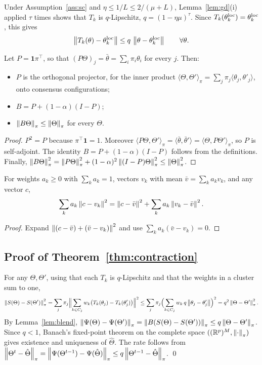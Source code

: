 Under Assumption~\ref{ass:sc} and $\eta\le1/L\le2/(\mu+L)$, Lemma~\ref{lem:gd}(i) applied
$\tau$ times shows that $T_k$ is $q$-Lipschitz, $q=(1-\eta\mu)^\tau$. Since
$T_k(\theta_k^{\mathrm{loc}})=\theta_k^{\mathrm{loc}}$, this gives
\begin{equation}
  \left\lVert T_k(\theta)-\theta_k^{\mathrm{loc}} \right\rVert\le q\,\left\lVert \theta-\theta_k^{\mathrm{loc}} \right\rVert\qquad\forall\theta.
  \label{eq:Tk_loc}
\end{equation}

\begin{lemma}[Blending]\label{lem:blend}
Let $P=\mathbf{1}\pi^\top$, so that $(P\Theta)_j=\bar\theta=\sum_i\pi_i\theta_i$ for every
$j$. Then:
\begin{itemize}[leftmargin=1.2em,itemsep=1pt]
  \item $P$ is the orthogonal projector, for the inner product
    $\langle\Theta,\Theta'\rangle_\pi=\sum_j\pi_j\langle\theta_j,\theta'_j\rangle$, onto
    consensus configurations;
  \item $B=P+(1-\alpha)(I-P)$;
  \item $\left\lVert B\Theta \right\rVert_{\pi}\le\left\lVert \Theta \right\rVert_{\pi}$ for every $\Theta$.
\end{itemize}
\end{lemma}
\begin{proof}
$P^2=P$ because $\pi^\top\mathbf 1=1$. Moreover
$\langle P\Theta,\Theta'\rangle_\pi=\langle\bar\theta,\bar\theta'\rangle=\langle\Theta,P\Theta'\rangle_\pi$,
so $P$ is self-adjoint. The identity $B=P+(1-\alpha)(I-P)$ follows from the definitions.
Finally,
$\left\lVert B\Theta \right\rVert_{\pi}^2=\left\lVert P\Theta \right\rVert_{\pi}^2+(1-\alpha)^2\left\lVert (I-P)\Theta \right\rVert_{\pi}^2\le\left\lVert \Theta \right\rVert_{\pi}^2$.
\end{proof}

\begin{lemma}\label{lem:anova}
For weights $a_k\ge0$ with $\sum_ka_k=1$, vectors $v_k$ with mean $\bar v=\sum_ka_kv_k$, and
any vector $c$,
\[
  \sum_ka_k\left\lVert c-v_k \right\rVert^2=\left\lVert c-\bar v \right\rVert^2+\sum_ka_k\left\lVert v_k-\bar v \right\rVert^2 .
\]
\end{lemma}
\begin{proof}
Expand $\left\lVert (c-\bar v)+(\bar v-v_k) \right\rVert^2$ and use $\sum_ka_k(\bar v-v_k)=0$.
\end{proof}

\subsection{Proof of Theorem~\ref{thm:contraction}}
For any $\Theta,\Theta'$, using that each $T_k$ is $q$-Lipschitz and that the weights in a
cluster sum to one,
\[
  \left\lVert S(\Theta)-S(\Theta') \right\rVert_{\pi}^2=\sum_j\pi_j\Bigl\|\sum_{k\in C_j}w_k\bigl(T_k(\theta_j)-T_k(\theta'_j)\bigr)\Bigr\|^2
  \le\sum_j\pi_j\Bigl(\sum_{k\in C_j}w_k\,q\left\lVert \theta_j-\theta'_j \right\rVert\Bigr)^2=q^2\left\lVert \Theta-\Theta' \right\rVert_{\pi}^2 .
\]
By Lemma~\ref{lem:blend},
$\left\lVert \Psi(\Theta)-\Psi(\Theta') \right\rVert_{\pi}=\left\lVert B(S(\Theta)-S(\Theta')) \right\rVert_{\pi}\le q\left\lVert \Theta-\Theta' \right\rVert_{\pi}$.
Since $q<1$, Banach's fixed-point theorem on the complete space
$((\mathbb{R}^p)^M,\left\lVert \cdot \right\rVert_{\pi})$ gives existence and uniqueness of $\hat\Theta$. The rate follows
from $\left\lVert \Theta^{t}-\hat\Theta \right\rVert_{\pi}=\left\lVert \Psi(\Theta^{t-1})-\Psi(\hat\Theta) \right\rVert_{\pi}\le q\left\lVert \Theta^{t-1}-\hat\Theta \right\rVert_{\pi}$.
\qed

